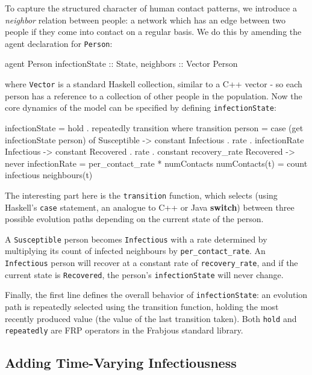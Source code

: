 \documentclass[oribibl]{llncs}
\begin{document}
  To capture the structured character of human contact patterns, we introduce a \emph{neighbor} relation between people: a network which has an edge between two people if they come into contact on a regular basis. We do this by amending the agent declaration for \lstinline{Person}: 
\begin{code}
	agent Person { infectionState :: State, 
			neighbors :: Vector Person} 
\end{code}
 where \lstinline{Vector} is a standard Haskell collection, similar to a C++ vector - so each person has a reference to a collection of other people in the population. 
  Now the core dynamics of the model can be specified by defining \lstinline{infectionState}:
\begin{code}
	infectionState = hold . repeatedly transition  
    	  where
	    transition person = 
	      case (get infectionState person) of 
             	Susceptible -> constant Infectious . rate . 
             				infectionRate
            	Infectious -> constant Recovered . rate . 
        	     			constant recovery_rate
             	Recovered -> never 
	    infectionRate = per_contact_rate * numContacts 
            numContacts(t) = count infectious neighbours(t)
\end{code}
The interesting part here is the \lstinline{transition} function, which selects (using Haskell's \lstinline{case} statement, an analogue to C++ or Java {\bfseries switch}) between three possible evolution paths depending on the current state of the person. 

   A \lstinline{Susceptible} person becomes \lstinline{Infectious} with a rate determined by multiplying its count of infected neighbours by \lstinline{per_contact_rate}. An \lstinline{Infectious} person will recover at a constant rate of \lstinline{recovery_rate}, and if the current state is \lstinline{Recovered}, the person's \lstinline{infectionState} will never change. 
   
   Finally, the first line defines the overall behavior of \lstinline{infectionState}: an evolution path is repeatedly selected using the transition function, holding the most recently produced value (the value of the last transition taken). Both \lstinline{hold} and \lstinline{repeatedly} are FRP operators in the Frabjous standard library. 
   
\subsection{Adding Time-Varying Infectiousness}
\label{time_varying}
\end{document}
